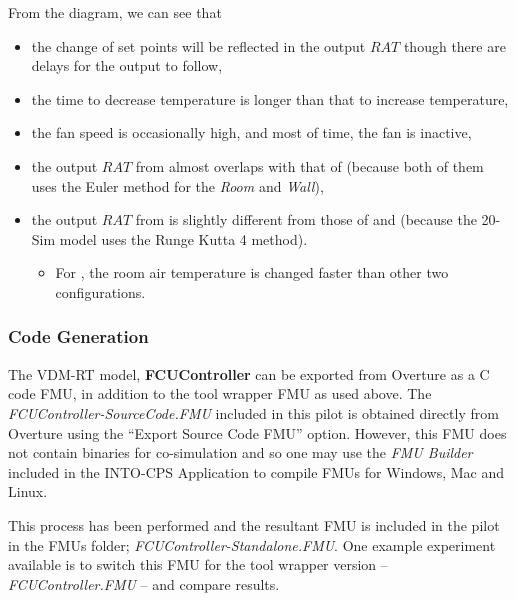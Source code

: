 From the diagram, we can see that
\begin{itemize}
    \item the change of set points will be reflected in the output $RAT$ though there are delays for the output to follow,
    \item the time to decrease temperature is longer than that to increase temperature,
    \item the fan speed is occasionally high, and most of time, the fan is inactive,
    \item the output $RAT$ from  almost overlaps with that of  (because both of them uses the Euler method for the \emph{Room} and \emph{Wall}), 
    \item the output $RAT$ from  is slightly different from those of  and  (because the  20-Sim model uses the Runge Kutta 4 method).
        \begin{itemize}
            \item For , the room air temperature is changed faster than other two configurations.
        \end{itemize}
\end{itemize}


\subsubsection{Code Generation}

The VDM-RT model, \textbf{FCUController} can be exported from Overture as a C code FMU, in addition to the tool wrapper FMU as used above. The \emph{FCUController-SourceCode.FMU} included in this pilot is obtained directly from Overture using the ``Export Source Code FMU'' option. However, this FMU does not contain binaries for co-simulation and so one may use the \emph{FMU Builder} included in the INTO-CPS Application to compile FMUs for Windows, Mac and Linux. 

This process has been performed and the resultant FMU is included in the pilot in the FMUs folder; \emph{FCUController-Standalone.FMU}. One example experiment available is to switch this FMU for the tool wrapper version -- \emph{FCUController.FMU} -- and compare results. 
